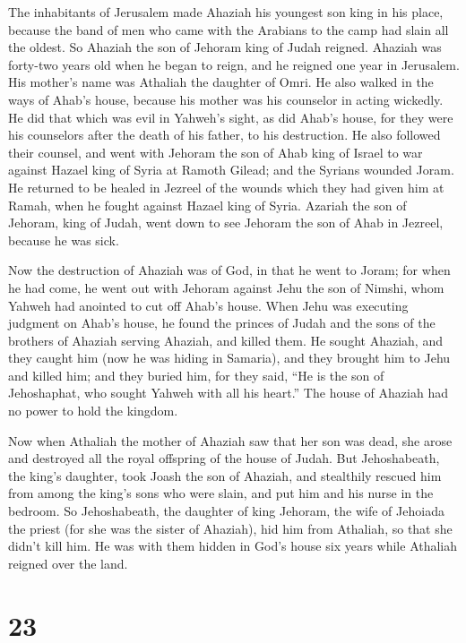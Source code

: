  The inhabitants of Jerusalem made Ahaziah his youngest son
king in his place, because the band of men who came with the Arabians to
the camp had slain all the oldest. So Ahaziah the son of Jehoram king of
Judah reigned.  Ahaziah was forty-two years old when he
began to reign, and he reigned one year in Jerusalem. His mother's name
was Athaliah the daughter of Omri.  He also walked in the
ways of Ahab's house, because his mother was his counselor in acting
wickedly.  He did that which was evil in Yahweh's sight, as
did Ahab's house, for they were his counselors after the death of his
father, to his destruction.  He also followed their counsel,
and went with Jehoram the son of Ahab king of Israel to war against
Hazael king of Syria at Ramoth Gilead; and the Syrians wounded Joram.
 He returned to be healed in Jezreel of the wounds which
they had given him at Ramah, when he fought against Hazael king of
Syria. Azariah the son of Jehoram, king of Judah, went down to see
Jehoram the son of Ahab in Jezreel, because he was sick.

 Now the destruction of Ahaziah was of God, in that he went
to Joram; for when he had come, he went out with Jehoram against Jehu
the son of Nimshi, whom Yahweh had anointed to cut off Ahab's house.
 When Jehu was executing judgment on Ahab's house, he found
the princes of Judah and the sons of the brothers of Ahaziah serving
Ahaziah, and killed them.  He sought Ahaziah, and they
caught him (now he was hiding in Samaria), and they brought him to Jehu
and killed him; and they buried him, for they said, ``He is the son of
Jehoshaphat, who sought Yahweh with all his heart.'' The house of
Ahaziah had no power to hold the kingdom.

 Now when Athaliah the mother of Ahaziah saw that her son
was dead, she arose and destroyed all the royal offspring of the house
of Judah.  But Jehoshabeath, the king's daughter, took
Joash the son of Ahaziah, and stealthily rescued him from among the
king's sons who were slain, and put him and his nurse in the bedroom. So
Jehoshabeath, the daughter of king Jehoram, the wife of Jehoiada the
priest (for she was the sister of Ahaziah), hid him from Athaliah, so
that she didn't kill him.  He was with them hidden in God's
house six years while Athaliah reigned over the land.

\hypertarget{section-22}{%
\section{23}\label{section-22}}

